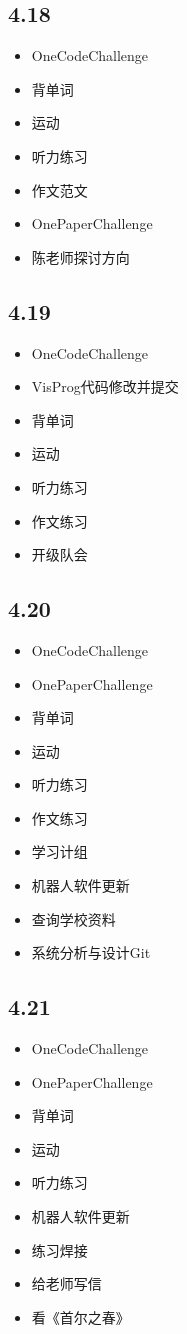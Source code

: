 \documentclass[UTF8]{ctexart}
\begin{document}
\subsection*{4.18}
\begin{itemize}
    \item OneCodeChallenge
    \item 背单词
    \item 运动
    \item 听力练习
    \item 作文范文
    \item OnePaperChallenge
    \item 陈老师探讨方向
\end{itemize}

\subsection*{4.19}
\begin{itemize}
    \item OneCodeChallenge
    \item VisProg代码修改并提交
    \item 背单词
    \item 运动
    \item 听力练习
    \item 作文练习
    \item 开级队会
\end{itemize}

\subsection*{4.20}
\begin{itemize}
    \item OneCodeChallenge
    \item OnePaperChallenge
    \item 背单词
    \item 运动
    \item 听力练习
    \item 作文练习
    \item 学习计组
    \item 机器人软件更新
    \item 查询学校资料
    \item 系统分析与设计Git
\end{itemize}

\subsection*{4.21}
\begin{itemize}
    \item OneCodeChallenge
    \item OnePaperChallenge
    \item 背单词
    \item 运动
    \item 听力练习
    \item 机器人软件更新
    \item 练习焊接
    \item 给老师写信
    \item 看《首尔之春》
\end{itemize}
\end{document}
